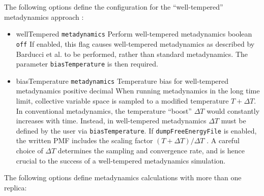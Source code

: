 \label{sec:colvarbias_well_tempered}
The following options define the configuration for the ``well-tempered'' metadynamics approach \cite{Barducci2008}:

\begin{itemize}
\item %
  \keydef
    {wellTempered}{%
    \texttt{metadynamics}}{%
    Perform well-tempered metadynamics}{%
    boolean}{%
    \texttt{off}}{%
    If enabled, this flag causes well-tempered metadynamics as
    described by Barducci et al.\cite{Barducci2008}
    to be performed, rather than standard metadynamics.  The parameter
    \texttt{biasTemperature} is then required.}

\item %
  \key
    {biasTemperature}{%
    \texttt{metadynamics}}{%
    Temperature bias for well-tempered metadynamics}{%
    positive decimal}{%
    When running metadynamics in the long time limit, collective variable space is sampled to a modified
    temperature $T+\Delta T$.  In conventional metadynamics, the temperature ``boost'' $\Delta T$ would
    constantly increases with time.  Instead, in well-tempered metadynamics $\Delta T$ must be defined by the
    user via \texttt{biasTemperature}.  If \texttt{dumpFreeEnergyFile} is enabled, the written PMF includes the
    scaling factor $(T+\Delta T)/\Delta T$ \cite{Barducci2008}.  A careful choice of $\Delta T$ determines the
    sampling and convergence rate, and is hence crucial to the success of a well-tempered metadynamics
    simulation.}
\end{itemize}


\label{sec:colvarbias_meta_mr}
The following options define metadynamics calculations with more than
one replica:

